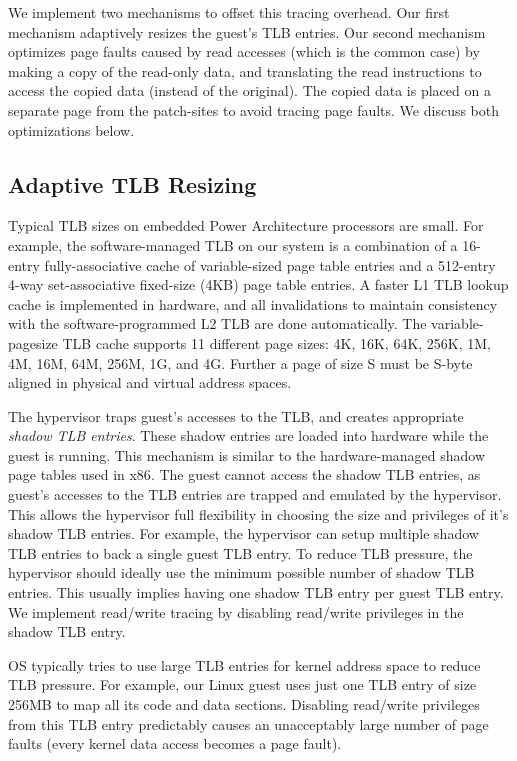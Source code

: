 \documentclass[10pt,twocolumn]{article}
\begin{document}
We implement two mechanisms to offset this tracing overhead. Our first mechanism
adaptively resizes the guest's TLB entries. Our second mechanism optimizes page faults
caused by read accesses (which is the common case) by making a copy of
the read-only data, and translating the read instructions
to access the copied data (instead of the original). The copied data is placed on
a separate page from the patch-sites to avoid tracing page faults. We discuss
both optimizations below.

\subsection{Adaptive TLB Resizing}
Typical TLB sizes on embedded Power Architecture processors are small.
For example, the software-managed TLB on our system is a combination of a 16-entry
fully-associative cache of variable-sized page table entries
and a 512-entry 4-way set-associative fixed-size (4KB) page table entries.
A faster L1 TLB lookup cache is implemented in hardware, and all invalidations
to maintain consistency with the software-programmed L2 TLB are done automatically.
The variable-pagesize TLB cache supports 11 different page sizes: 4K, 16K, 64K,
256K, 1M, 4M, 16M, 64M, 256M, 1G, and 4G. Further a page of size S must be S-byte
aligned in physical and virtual address spaces.

The hypervisor traps guest's accesses to the TLB, and creates appropriate
{\em shadow TLB entries}. These shadow entries are loaded into hardware
while the guest is
running. This mechanism is similar to the hardware-managed shadow page
tables used in x86\cite{agesen:comparison}. The guest cannot access the shadow
TLB entries, as guest's accesses to the TLB entries are trapped and emulated by
the hypervisor. This allows the hypervisor full flexibility in choosing the
size and privileges of it's shadow TLB entries. For example, the hypervisor
can setup multiple shadow TLB entries to back a single guest TLB entry.
To reduce TLB pressure, the hypervisor should ideally
use the minimum possible number of shadow TLB entries. This usually implies having
one shadow TLB entry per guest TLB entry. We implement read/write tracing by disabling
read/write privileges in the shadow TLB entry.

OS typically tries to use large TLB entries for kernel address space to
reduce TLB pressure. For example, our Linux guest
uses just one TLB entry of size 256MB to map all its code and data sections.
Disabling read/write privileges from this TLB entry predictably causes an unacceptably
large number of page faults (every kernel data access becomes a page fault).
\end{document}
